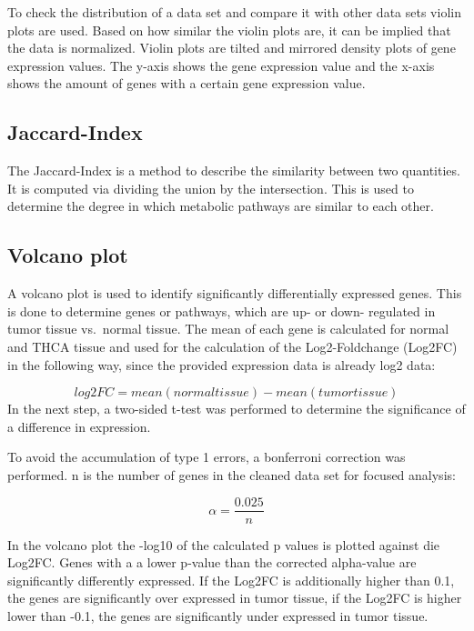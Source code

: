 \documentclass[
  parskip,
  oneside]{scrreprt}
\begin{document}
To check the distribution of a data set and compare it with other data
sets violin plots are used. Based on how similar the violin plots are,
it can be implied that the data is normalized. Violin plots are tilted
and mirrored density plots of gene expression values. The y-axis shows
the gene expression value and the x-axis shows the amount of genes with
a certain gene expression value.

\hypertarget{jaccard-index-1}{%
\subsection{Jaccard-Index}\label{jaccard-index-1}}

The Jaccard-Index is a method to describe the similarity between two
quantities. It is computed via dividing the union by the intersection.
This is used to determine the degree in which metabolic pathways are
similar to each other.

\hypertarget{volcano-plot}{%
\subsection{Volcano plot}\label{volcano-plot}}

A volcano plot is used to identify significantly differentially
expressed genes. This is done to determine genes or pathways, which are
up- or down- regulated in tumor tissue vs.~normal tissue. The mean of
each gene is calculated for normal and THCA tissue and used for the
calculation of the Log2-Foldchange (Log2FC) in the following way, since
the provided expression data is already log2 data:

\[
log2FC = mean(normal tissue) - mean(tumor tissue)
\] In the next step, a two-sided t-test was performed to determine the
significance of a difference in expression.

To avoid the accumulation of type 1 errors, a bonferroni correction was
performed. n is the number of genes in the cleaned data set for focused
analysis:

\[
\alpha = \frac{0.025}{n}
\]

In the volcano plot the -log10 of the calculated p values is plotted
against die Log2FC. Genes with a a lower p-value than the corrected
alpha-value are significantly differently expressed. If the Log2FC is
additionally higher than 0.1, the genes are significantly over expressed
in tumor tissue, if the Log2FC is higher lower than -0.1, the genes are
significantly under expressed in tumor tissue.
\end{document}
